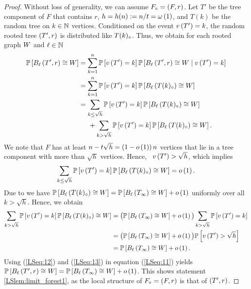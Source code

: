 \begin{proof}
Without loss of generality, we can assume $F_\circ=\left(F, r\right)$. Let $T'$ be the tree component of $F$ that contains $r$, $h=h(n):=n/t=\omega\left(1\right)$, and $T(k)$ be the random tree on $k\in \mathbb{N}$ vertices. Conditioned on the event $v\left({T'}\right)=k$, the random rooted tree $\left(T', r\right)$ is distributed like $T(k)_\circ$. Thus, we obtain for each rooted graph $W$ and $\ell\in \mathbb{N}$
\begin{align}\label{LSeq:11}
\mathbb{P}\left[B_{\ell}\left(T', r\right)\cong W\right]&=
\sum_{k=1}^{n}\mathbb{P}\left[v\left({T'}\right)=k\right]\mathbb{P}\left[B_{\ell}\left(T', r\right)\cong W \;\middle|\; v\left({T'}\right)=k\right]\nonumber
\\
&=
\sum_{k=1}^{n}\mathbb{P}\left[v\left({T'}\right)=k\right]\mathbb{P}\left[B_{\ell}\left(T(k)_\circ\right)\cong W\right]\nonumber
\\
&=
\sum_{k\leq \sqrt{h}}\mathbb{P}\left[v\left({T'}\right)=k\right]\mathbb{P}\left[B_{\ell}\left(T(k)_\circ\right)\cong W\right]
\nonumber
\\
&\hspace{0.5cm}+
\sum_{k>\sqrt{h}}\mathbb{P}\left[v\left({T'}\right)=k\right]\mathbb{P}\left[B_{\ell}\left(T(k)_\circ\right)\cong W\right].
\end{align}
We note that $F$ has at least $n-t\sqrt{h}=\left(1-o\left(1\right)\right)n$ vertices that lie in a tree component with more than $\sqrt{h}$ vertices. Hence, \whp\ $v\left({T'}\right)>\sqrt{h}$, which implies 
\begin{align}\label{LSeq:12}
\sum_{k\leq \sqrt{h}}\mathbb{P}\left[v\left({T'}\right)=k\right]\mathbb{P}\left[B_{\ell}\left(T(k)_\circ\right)\cong W\right]=o\left(1\right).
\end{align}
Due to  we have $\mathbb{P}\left[B_{\ell}\left(T(k)_\circ\right)\cong W\right]=\mathbb{P}\left[B_{\ell}\left(T_\infty\right)\cong W\right]+o\left(1\right)$ uniformly over all $k>\sqrt{h}$. Hence, we obtain
\begin{align}\label{LSeq:13}
\sum_{k>\sqrt{h}}\mathbb{P}\left[v\left({T'}\right)=k\right]\mathbb{P}\left[B_{\ell}\left(T(k)_\circ\right)\cong W\right]
&=
\big(\mathbb{P}\left[B_{\ell}\left(T_\infty\right)\cong W\right]+o\left(1\right)\big)\sum_{k>\sqrt{h}}\mathbb{P}\left[v\left({T'}\right)=k\right]\nonumber
\\
&=\big(\mathbb{P}\left[B_{\ell}\left(T_\infty\right)\cong W\right]+o\left(1\right)\big)\mathbb{P}\left[v\left({T'}\right)>\sqrt{h}\right]\nonumber
\\
&=
\mathbb{P}\left[B_{\ell}\left(T_\infty\right)\cong W\right]+o\left(1\right).
\end{align}
Using (\ref{LSeq:12}) and (\ref{LSeq:13}) in equation (\ref{LSeq:11}) yields $\mathbb{P}\left[B_{\ell}\left(T', r\right)\cong W\right]=\mathbb{P}\left[B_{\ell}\left(T_\infty\right)\cong W\right]+o\left(1\right)$. This shows statement \ref{LSlem:limit_forest1}, as the local structure of $F_\circ=\left(F, r\right)$ is that of $\left(T', r\right)$.


\end{proof}
